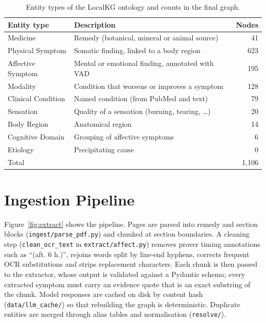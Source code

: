 \documentclass[12pt,a4paper,oneside]{report}
\newcommand{\code}[1]{\texttt{\small #1}}
\begin{document}
\begin{table}[H]
\centering
\caption{Entity types of the LocalKG ontology and counts in the final graph.}
\label{tab:ontology}
\small
\begin{tabularx}{\linewidth}{@{}l X r@{}}
\toprule
Entity type & Description & Nodes\\
\midrule
Medicine & Remedy (botanical, mineral or animal source) & 41\\
Physical Symptom & Somatic finding, linked to a body region & 623\\
Affective Symptom & Mental or emotional finding, annotated with VAD & 195\\
Modality & Condition that worsens or improves a symptom & 128\\
Clinical Condition & Named condition (from PubMed and text) & 79\\
Sensation & Quality of a sensation (burning, tearing, \ldots) & 20\\
Body Region & Anatomical region & 14\\
Cognitive Domain & Grouping of affective symptoms & 6\\
Etiology & Precipitating cause & 0\\
\midrule
Total & & 1{,}106\\
\bottomrule
\end{tabularx}
\end{table}

\section{Ingestion Pipeline}
Figure~\ref{fig:extract} shows the pipeline. Pages are parsed into remedy and section blocks (\code{ingest/parse\_pdf.py}) and chunked at section boundaries. A cleaning step (\code{clean\_ocr\_text} in \code{extract/affect.py}) removes prover timing annotations such as ``(aft. 6 h.)'', rejoins words split by line-end hyphens, corrects frequent OCR substitutions and strips replacement characters. Each chunk is then passed to the extractor, whose output is validated against a Pydantic schema; every extracted symptom must carry an evidence quote that is an exact substring of the chunk. Model responses are cached on disk by content hash (\code{data/llm\_cache/}) so that rebuilding the graph is deterministic. Duplicate entities are merged through alias tables and normalisation (\code{resolve/}).
\end{document}
